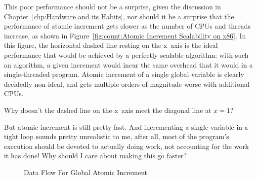 This poor performance should not be a surprise, given the discussion in
Chapter~\ref{chp:Hardware and its Habits},
nor should it be a surprise that the performance of atomic increment
gets slower as the number of CPUs and threads increase, as shown in
Figure~\ref{fig:count:Atomic Increment Scalability on x86}.
In this figure, the horizontal dashed line resting on the x~axis
is the ideal performance that would be achieved
by a perfectly scalable algorithm: with such an algorithm, a given
increment would incur the same overhead that it would in a single-threaded
program.
Atomic increment of a single global variable is clearly
decidedly non-ideal, and gets multiple orders of magnitude worse with
additional CPUs.

\QuickQuiz{}
	Why doesn't the dashed line on the x~axis meet the 
	diagonal line at $x=1$?
 \QuickQuizEnd

\QuickQuiz{}
	But atomic increment is still pretty fast.
	And incrementing a single variable in a tight loop sounds
	pretty unrealistic to me, after all, most of the program's
	execution should be devoted to actually doing work, not accounting
	for the work it has done!
	Why should I care about making this go faster?
 \QuickQuizEnd

\begin{figure}[tb]
\centering
{}
\caption{Data Flow For Global Atomic Increment}
\label{fig:count:Data Flow For Global Atomic Increment}
\end{figure}

